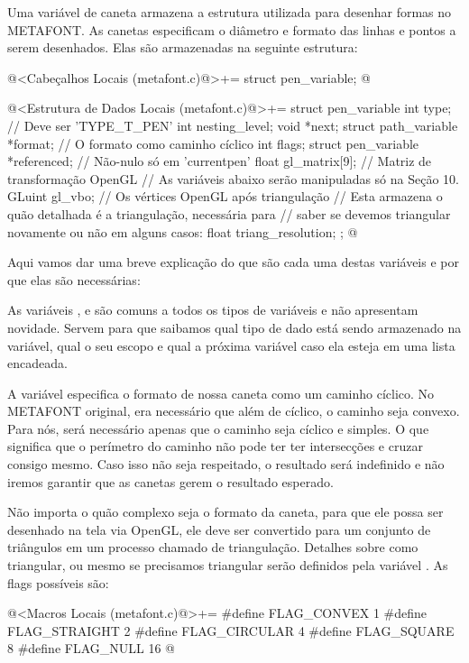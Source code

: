 
Uma variável de caneta armazena a estrutura utilizada para desenhar
formas no METAFONT. As canetas especificam o diâmetro e formato das
linhas e pontos a serem desenhados. Elas são armazenadas na seguinte
estrutura:

\iniciocodigo
@<Cabeçalhos Locais (metafont.c)@>+=
struct pen_variable;
@
\fimcodigo

\iniciocodigo
@<Estrutura de Dados Locais (metafont.c)@>+=
struct pen_variable{
  int type; // Deve ser 'TYPE_T_PEN'
  int nesting_level;
  void *next;
  struct path_variable *format; // O formato como caminho cíclico
  int flags;
  struct pen_variable *referenced; // Não-nulo só em 'currentpen'
  float gl_matrix[9]; // Matriz de transformação OpenGL
  // As variáveis abaixo serão manipuladas só na Seção 10.
  GLuint gl_vbo; // Os vértices OpenGL após triangulação
  // Esta armazena o quão detalhada é a triangulação, necessária para
  // saber se devemos triangular novamente ou não em alguns casos:
  float triang_resolution; 
};
@
\fimcodigo

Aqui vamos dar uma breve explicação do que são cada uma destas
variáveis e por que elas são necessárias:

As variáveis , 
e  são comuns a todos os tipos de variáveis e não
apresentam novidade. Servem para que saibamos qual tipo de dado está
sendo armazenado na variável, qual o seu escopo e qual a próxima
variável caso ela esteja em uma lista encadeada.

A variável  especifica o formato de nossa caneta
como um caminho cíclico. No METAFONT original, era necessário que além
de cíclico, o caminho seja convexo. Para nós, será necessário apenas
que o caminho seja cíclico e simples. O que significa que o perímetro
do caminho não pode ter ter intersecções e cruzar consigo mesmo. Caso
isso não seja respeitado, o resultado será indefinido e não iremos
garantir que as canetas gerem o resultado esperado.

Não importa o quão complexo seja o formato da caneta, para que ele
possa ser desenhado na tela via OpenGL, ele deve ser convertido para
um conjunto de triângulos em um processo chamado de
triangulação. Detalhes sobre como triangular, ou mesmo se precisamos
triangular serão definidos pela variável . As flags
possíveis são:

\iniciocodigo
@<Macros Locais (metafont.c)@>+=
#define FLAG_CONVEX   1
#define FLAG_STRAIGHT 2
#define FLAG_CIRCULAR 4
#define FLAG_SQUARE   8
#define FLAG_NULL    16
@
\fimcodigo


